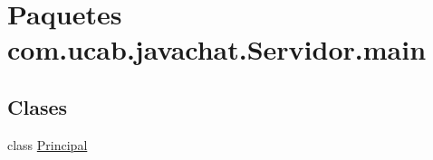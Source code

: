 \hypertarget{namespacecom_1_1ucab_1_1javachat_1_1_servidor_1_1main}{\section{Paquetes com.\-ucab.\-javachat.\-Servidor.\-main}
\label{namespacecom_1_1ucab_1_1javachat_1_1_servidor_1_1main}
}
\subsection*{Clases}
\begin{DoxyCompactItemize}
\item 
class \hyperlink{classcom_1_1ucab_1_1javachat_1_1_servidor_1_1main_1_1_principal}{Principal}
\end{DoxyCompactItemize}
